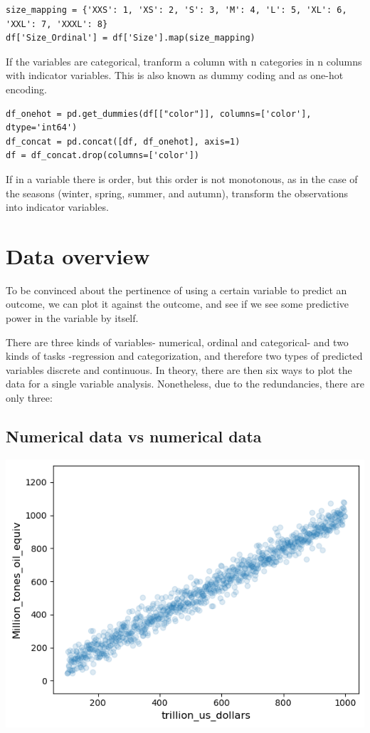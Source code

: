 \documentclass[24pt]{article}
\begin{document}
\begin{lstlisting}
size_mapping = {'XXS': 1, 'XS': 2, 'S': 3, 'M': 4, 'L': 5, 'XL': 6, 'XXL': 7, 'XXXL': 8}
df['Size_Ordinal'] = df['Size'].map(size_mapping)
\end{lstlisting}




If the variables are categorical, tranform a column with n categories in n columns with indicator variables. This is also known as dummy coding and as one-hot encoding. 

\begin{lstlisting}
df_onehot = pd.get_dummies(df[["color"]], columns=['color'], dtype='int64')  
df_concat = pd.concat([df, df_onehot], axis=1)
df = df_concat.drop(columns=['color'])
\end{lstlisting}

If in a variable there is order, but this order is not monotonous, as in the case of the seasons (winter, spring, summer, and autumn), transform the observations into indicator variables. 

\section{Data overview}

To be convinced about the pertinence of using a certain variable to predict an outcome, we can plot it against the outcome, and see if we see some predictive power in the variable by itself.

There are three kinds of variables- numerical, ordinal and categorical- and two kinds of tasks -regression and categorization, and therefore two types of predicted variables discrete and continuous. In theory, there are then six ways to plot the data for a single variable analysis. Nonetheless, due to the redundancies, there are only three: 

\subsection{Numerical data vs numerical data}
\begin{center}
\includegraphics[scale = 0.5]{numeric_vs_numeric.png}
\end{center}
\end{document}
